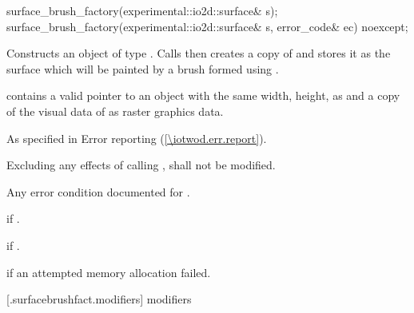 \begin{itemdecl}
    surface_brush_factory(experimental::io2d::surface& s);
    surface_brush_factory(experimental::io2d::surface& s, error_code& ec) noexcept;
\end{itemdecl}
\begin{itemdescr}
	\pnum
	\effects
	Constructs an object of type . Calls  then creates a copy of  and stores it as the surface which will be painted by a brush formed using .
	
	\pnum
	\postconditions
	 contains a valid pointer to an  object with the same width, height,  as  and a copy of the visual data of  as raster graphics data.
	
	\pnum
	\throws
	As specified in Error reporting (\ref{\iotwod.err.report}).
	
	\pnum
	\remarks
	Excluding any effects of calling ,  shall not be modified.
	
	\pnum
	\errors
	Any error condition documented for .
	
	\pnum
	 if .
	
	\pnum
	 if .
	
	\pnum
	 if an attempted memory allocation failed.
	
\end{itemdescr}

 [\iotwod.surfacebrushfact.modifiers]{ modifiers}

